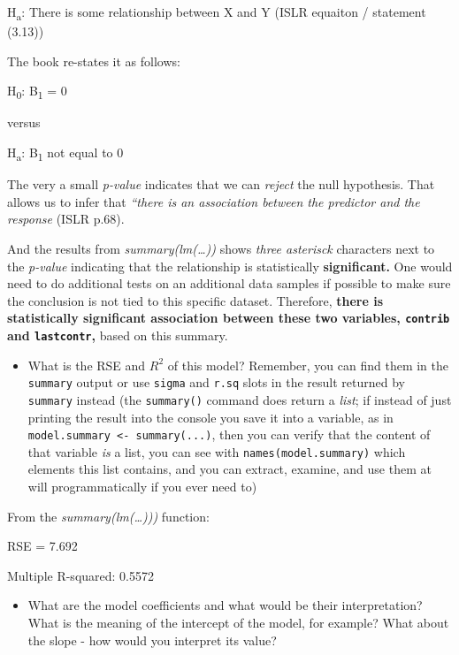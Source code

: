 \documentclass[
]{article}
\providecommand{\tightlist}{%
  \setlength{\itemsep}{0pt}\setlength{\parskip}{0pt}}
\begin{document}
H\textsubscript{a}: There is some relationship between X and Y (ISLR
equaiton / statement (3.13))

The book re-states it as follows:

H\textsubscript{0}: B\textsubscript{1} = 0

versus

H\textsubscript{a}: B\textsubscript{1} not equal to 0

The very a small \emph{p-value} indicates that we can \emph{reject} the
null hypothesis. That allows us to infer that \emph{``there is an
association between the predictor and the response} (ISLR p.68).

And the results from \emph{summary(lm(\ldots))} shows \emph{three
asterisck} characters next to the \emph{p-value} indicating that the
relationship is statistically \textbf{significant.} One would need to do
additional tests on an additional data samples if possible to make sure
the conclusion is not tied to this specific dataset. Therefore,
\textbf{there is statistically significant association between these two
variables, \texttt{contrib} and \texttt{lastcontr},} based on this
summary.

\begin{itemize}
\tightlist
\item
  What is the RSE and \(R^2\) of this model? Remember, you can find them
  in the \texttt{summary} output or use \texttt{sigma} and \texttt{r.sq}
  slots in the result returned by \texttt{summary} instead (the
  \texttt{summary()} command does return a \emph{list}; if instead of
  just printing the result into the console you save it into a variable,
  as in \texttt{model.summary\ \textless{}-\ summary(...)}, then you can
  verify that the content of that variable \emph{is} a list, you can see
  with \texttt{names(model.summary)} which elements this list contains,
  and you can extract, examine, and use them at will programmatically if
  you ever need to)
\end{itemize}

From the \emph{summary(lm(\ldots)))} function:

RSE = 7.692

Multiple R-squared: 0.5572

\begin{itemize}
\tightlist
\item
  What are the model coefficients and what would be their
  interpretation? What is the meaning of the intercept of the model, for
  example? What about the slope - how would you interpret its value?
\end{itemize}
\end{document}
